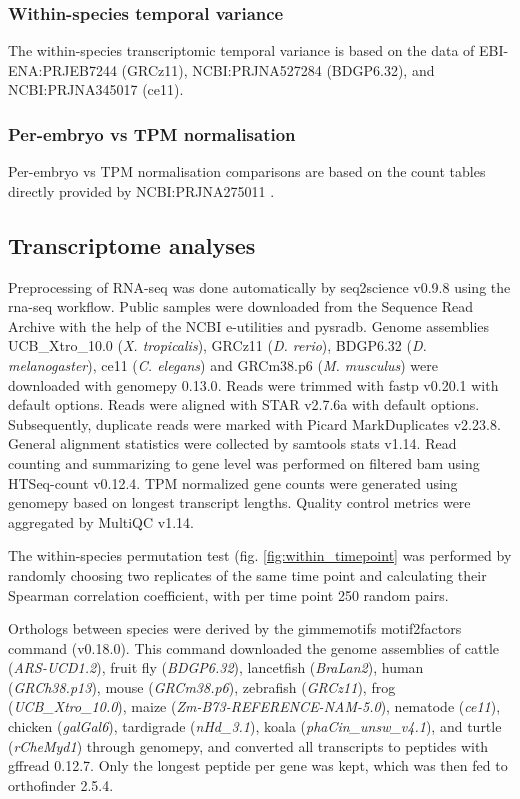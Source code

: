 \subsubsection{Within-species temporal variance}

The within-species transcriptomic temporal variance is based on the data of EBI-ENA:PRJEB7244 \cite{White2017} (GRCz11), NCBI:PRJNA527284 \cite{Liu2021} (BDGP6.32), and NCBI:PRJNA345017 \cite{Zalts2017} (ce11).

\subsubsection{Per-embryo vs TPM normalisation}

Per-embryo vs TPM normalisation comparisons are based on the count tables directly provided by NCBI:PRJNA275011 \cite{Owens2016}.

\subsection{Transcriptome analyses}

Preprocessing of RNA-seq was done automatically by seq2science v0.9.8\cite{seq2science} using the rna-seq workflow. Public samples were downloaded from the Sequence Read Archive with the help of the NCBI e-utilities and pysradb\cite{Choudhary2019}. Genome assemblies UCB\_Xtro\_10.0 (\textit{X. tropicalis}), GRCz11 (\textit{D. rerio}), BDGP6.32 (\textit{D. melanogaster}), ce11 (\textit{C. elegans}) and GRCm38.p6 (\textit{M. musculus}) were downloaded with genomepy 0.13.0\cite{genomepy}. Reads were trimmed with fastp v0.20.1\cite{Chen2018} with default options. Reads were aligned with STAR v2.7.6a\cite{Dobin2012} with default options. Subsequently, duplicate reads were marked with Picard MarkDuplicates v2.23.8\cite{picard}. General alignment statistics were collected by samtools stats v1.14\cite{Danecek2021}. Read counting and summarizing to gene level was performed on filtered bam using HTSeq-count v0.12.4\cite{Anders2014}. TPM normalized gene counts were generated using genomepy based on longest transcript lengths. Quality control metrics were aggregated by MultiQC v1.14\cite{Ewels2016}. 

The within-species permutation test (fig. \ref{fig:within_timepoint} was performed by randomly choosing two replicates of the same time point and calculating their Spearman correlation coefficient, with per time point 250 random pairs.

Orthologs between species were derived by the gimmemotifs motif2factors command (v0.18.0). This command downloaded the genome assemblies of cattle (\textit{ARS-UCD1.2}), fruit fly (\textit{BDGP6.32}), lancetfish (\textit{BraLan2}), human (\textit{GRCh38.p13}), mouse (\textit{GRCm38.p6}), zebrafish (\textit{GRCz11}), frog (\textit{UCB\_Xtro\_10.0}), maize (\textit{Zm-B73-REFERENCE-NAM-5.0}), nematode (\textit{ce11}), chicken (\textit{galGal6}), tardigrade (\textit{nHd\_3.1}),	koala (\textit{phaCin\_unsw\_v4.1}), and turtle (\textit{rCheMyd1}) through genomepy\cite{genomepy}, and converted all transcripts to peptides with gffread 0.12.7\cite{Pertea2020}. Only the longest peptide per gene was kept, which was then fed to orthofinder 2.5.4\cite{Emms2019}.

